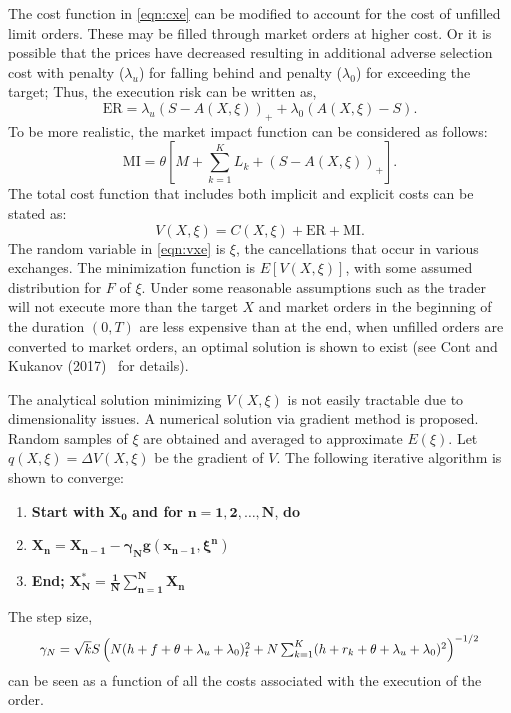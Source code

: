 The cost function in \eqref{eqn:cxe} can be modified to account for the cost of unfilled limit orders. These may be filled through market orders at higher cost. Or it is possible that the prices have decreased resulting in additional adverse selection cost with penalty ($\lambda_u$) for falling behind and penalty ($\lambda_0$) for exceeding the target; Thus, the execution risk can be written as,
	\begin{equation}\label{eqn:er}
	\text{ER}= \lambda_u (S-A(X,\xi))_+ + \lambda_0 (A(X,\xi)-S).
	\end{equation}
To be more realistic, the market impact function can be considered as follows:
	\begin{equation}\label{eqn:mi}
	\text{MI}= \theta \left[ M + \sum_{k=1}^K L_k + (S-A(X,\xi))_+ \right].
	\end{equation}
The total cost function that includes both implicit and explicit costs can be stated as:
	\begin{equation}\label{eqn:vxe}
	V(X,\xi)= C(X,\xi) + \text{ER} + \text{MI}.
	\end{equation}
The random variable in \eqref{eqn:vxe} is $\xi$, the cancellations that occur in various exchanges. The minimization function is $E[V(X,\xi)]$, with some assumed distribution for $F$ of $\xi$. Under some reasonable assumptions such as the trader will not execute more than the target $X$ and market orders in the beginning of the duration $(0,T)$ are less expensive than at the end, when unfilled orders are converted to market orders, an optimal solution is shown to exist (see Cont and Kukanov (2017)~\cite{contk} for details).


The analytical solution minimizing $V(X,\xi)$ is not easily tractable due to dimensionality issues. A numerical solution via gradient method is proposed. Random samples of $\xi$ are obtained and averaged to approximate $E(\xi)$. Let $q(X,\xi)= \Delta V(X,\xi)$ be the gradient of $V$. The following iterative algorithm is shown to converge:
	\begin{enumerate}[--]
	\item \textbf{Start with }$\mathbf{X_0}$\textbf{ and for }$\mathbf{n=1,2,\ldots,N}$,\textbf{ do}
	\item $\mathbf{X_n=X_{n-1} - \gamma_N g(x_{n-1}, \xi^n)}$
	\item \textbf{End; }$\mathbf{X_N^* = \frac{1}{N} \sum_{n=1}^N X_n}$
	\end{enumerate}
The step size, 
	\begin{equation} \label{eqn:7gammaN}
	\scalebox{0.93}{$\gamma_N = \sqrt{k} S \left( N(h+f+\theta+\lambda_u +\lambda_0)^2 _ t + N \sum_{k=1}^K (h+r_k+\theta+\lambda_u+\lambda_0)^2 \right)^{-1/2}$}
	\end{equation}
can be seen as a function of all the costs associated with the execution of the order.\label{in:tradecost3}


